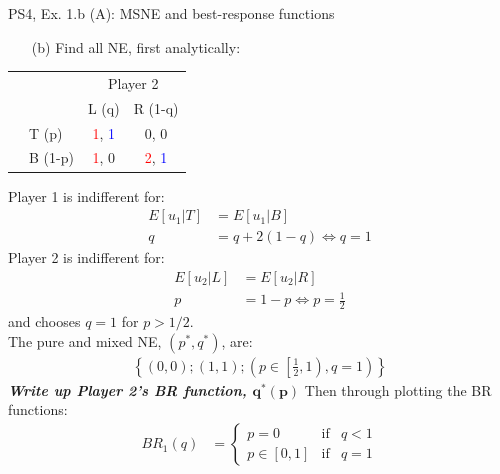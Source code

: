 \begin{frame}{PS4, Ex. 1.b (A): MSNE and best-response functions}
  \begin{multicols}{2}
    \begin{itemize}
      \item[(b)] Find all NE, first analytically:
    \end{itemize}
    \vspace{-8pt}
    \begin{table}
      \begin{tabular}{cl|c|c|}
        & \multicolumn{1}{c}{} & \multicolumn{2}{c}{\color{blue}Player 2}\\
        \parbox[t]{1mm}{}
        &  &  &  \\
        & T (p) & \textcolor{red}{1}, \textcolor{blue}{1} & 0, 0 \\
        & B (1-p) & \textcolor{red}{1}, 0 & \textcolor{red}{2}, \textcolor{blue}{1} \\
      \end{tabular}
    \end{table}
    Player 1 is indifferent for:
    \begin{align*}
      E[u_1|T]&=E[u_1|B]\\
      q &= q + 2(1-q) \Leftrightarrow q = 1
    \end{align*}
    Player 2 is indifferent for:
    \begin{align*}
      E[u_2|L]&=E[u_2|R]\\
      p &= 1-p \Leftrightarrow p = \frac{1}{2}
    \end{align*}
    and chooses $q=1$ for $p>1/2$.\\\medskip
    The pure and mixed NE, $(p^{*},q^{*})$, are:
    \begin{align*}
      \left\{(0,0);(1,1);\left(p\in\left[\frac{1}{2},1\right),q=1\right)\right\}
    \end{align*}
    \textbf{\textit{Write up Player 2's BR function, $\bm{q^{*}(p)}$}}
  \vfill\null \columnbreak
    Then through plotting the BR functions:
    \vspace{-8pt}
    \begin{align*}
      BR_1(q)&=\left\{ \begin{array}{lcl}
          p=0       & \text{if} & q<1 \\
          p\in[0,1] & \text{if} & q=1
      \end{array}\right.\\

\end{align*}
\end{multicols}
\end{frame}
